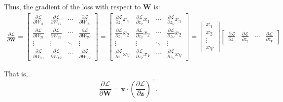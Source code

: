 \begin{notechapter}
Thus, the gradient of the loss with respect to \(\mathbf{W}\) is:
\begin{align*}
    \frac{\partial \mathcal{L}}{\partial \mathbf{W}} =
    \begin{bmatrix}
        \frac{\partial \mathcal{L}}{\partial W_{11}} &
        \frac{\partial \mathcal{L}}{\partial W_{12}} & 
        \cdots &
        \frac{\partial \mathcal{L}}{\partial W_{1V}} \\[6pt]
        \frac{\partial \mathcal{L}}{\partial W_{21}} &
        \frac{\partial \mathcal{L}}{\partial W_{22}} & 
        \cdots &
        \frac{\partial \mathcal{L}}{\partial W_{2V}} \\
        \vdots & \vdots & \ddots & \vdots \\
        \frac{\partial \mathcal{L}}{\partial W_{V1}} &
        \frac{\partial \mathcal{L}}{\partial W_{V2}} & 
        \cdots &
        \frac{\partial \mathcal{L}}{\partial W_{VV}} 
    \end{bmatrix} 
    =
    \begin{bmatrix}
        \frac{\partial \mathcal{L}}{\partial z_{1}} x_1 &
        \frac{\partial \mathcal{L}}{\partial z_{2}} x_1 & 
        \cdots &
        \frac{\partial \mathcal{L}}{\partial z_{V}} x_1\\[6pt]
        \frac{\partial \mathcal{L}}{\partial z_{1}} x_2 &
        \frac{\partial \mathcal{L}}{\partial z_{2}} x_2 & 
        \cdots &
        \frac{\partial \mathcal{L}}{\partial z_{V}} x_2\\
        \vdots & \vdots & \ddots & \vdots \\
        \frac{\partial \mathcal{L}}{\partial z_{1}} x_V &
        \frac{\partial \mathcal{L}}{\partial z_{2}} x_V & 
        \cdots &
        \frac{\partial \mathcal{L}}{\partial z_{V}} x_V
    \end{bmatrix}
    =
    \begin{bmatrix}
        x_1\\[6pt]
        x_2\\
        \vdots \\
        x_V
    \end{bmatrix}
    \begin{bmatrix}
        \frac{\partial \mathcal{L}}{\partial z_{1}} &
        \frac{\partial \mathcal{L}}{\partial z_{2}} & 
        \cdots &
        \frac{\partial \mathcal{L}}{\partial z_{V}} 
    \end{bmatrix}
\end{align*}

That is,
\[
    \frac{\partial \mathcal{L}}{\partial \mathbf{W}}
=
\mathbf{x} \cdot \left( \frac{\partial \mathcal{L}}
{\partial \mathbf{z}} \right)^\top.
\]


\end{notechapter}
